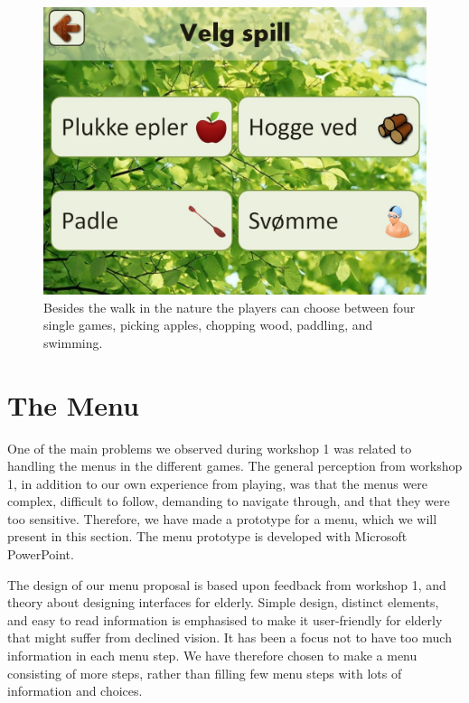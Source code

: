 \begin{figure} [ht!]
\centering
\includegraphics[scale=0.4]{VelgSpill.jpg}
\caption[The four single games]{Besides the walk in the nature the players can choose between four single games, picking apples, chopping wood, paddling, and swimming.}
\label{fig:velgSpill}
\end{figure}


\section{The Menu}

One of the main problems we observed during workshop 1 was related to handling the menus in the different games. The general perception from workshop 1, in addition to our own experience from playing, was that the menus were complex, difficult to follow, demanding to navigate through, and that they were too sensitive. Therefore, we have made a prototype for a menu, which we will present in this section. The menu prototype is developed with Microsoft PowerPoint.

The design of our menu proposal is based upon feedback from workshop 1, and theory about designing interfaces for elderly. Simple design, distinct elements, and easy to read information is emphasised to make it user-friendly for elderly that might suffer from declined vision. It has been a focus not to have too much information in each menu step. We have therefore chosen to make a menu consisting of more steps, rather than filling few menu steps with lots of information and choices.   

